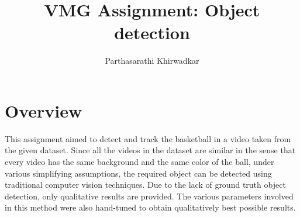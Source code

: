 \documentclass[12pt]{article}
\title{VMG Assignment: Object detection}
\author{Parthasarathi Khirwadkar}
\date{}
\begin{document}
\maketitle
\section*{Overview}
This assignment aimed to detect and track the basketball in a video taken from the given dataset. Since all the videos in the dataset are similar in the sense that every video has the same background and the same color of the ball, under various simplifying assumptions, the required object can be detected using traditional computer vision techniques. Due to the lack of ground truth object detection, only qualitative results are provided. The various parameters involved in this method were also hand-tuned to obtain qualitatively best possible results.
\end{document}
